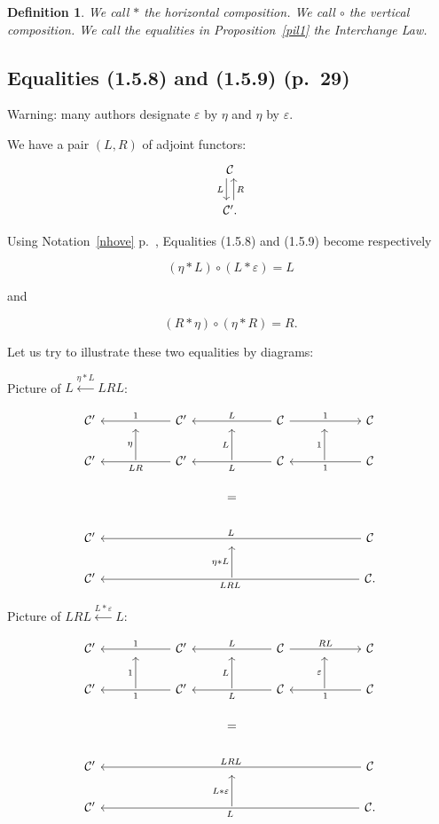 \documentclass[12pt]{article}%
\newtheorem{df}[thm]{Definition}%
\theoremstyle{remark}
\theoremstyle{definition}
\newcommand{\nn}{\noindent}
\newcommand{\C}{\mathcal C}
\newcommand{\ee}{\varepsilon}
\begin{document}
\begin{df}\label{dil1} 
We call $*$ the {\em horizontal composition}.  We call $\circ$ the {\em vertical composition}.  We call the equalities in Proposition~\ref{pil1} the {\em Interchange Law}. 
\end{df}


\subsection{Equalities (1.5.8) and (1.5.9) (p.~29)}

Warning: many authors designate $\varepsilon$ by $\eta$ and $\eta$ by $\varepsilon$. 

We have a pair $(L,R)$ of adjoint functors: 
$$
\begin{tikzcd}
\C\ar[xshift=-.7ex]{d}[swap]{L}\\ 
\C'.\ar[xshift=.7ex]{u}[swap]{R}
\end{tikzcd}
$$

Using Notation~\ref{nhove} p.~\pageref{nhove}, Equalities (1.5.8) and (1.5.9) become respectively 

\begin{equation}\label{158}
(\eta*L)\circ(L*\ee)=L
\end{equation}

\nn and 

\begin{equation}\label{159}
(R*\eta)\circ(\eta*R)=R.
\end{equation}

Let us try to illustrate these two equalities by diagrams:

Picture of $L\xleftarrow{\eta*L}LRL$:
 
$$
\begin{tikzcd}
%
\C'&{}&\C'\ar{ll}{}[swap]{1}&{}&\C\ar{ll}{}[swap]{L}\ar{rr}{}{1}&{}&\C\\ 
%
\C'&\ar{u}{\eta}&\C'\ar{ll}{}{LR}&\ar{u}{L}&\C\ar{ll}{}{L}&\ar{u}{1}&\C\ar{ll}{}{1}\\ 
%
&&&=\\ 
%
\C'&&&{}&&&\C\ar{llllll}[swap]{L}\\
%
\C'&&&\ar{u}{\eta*L}&&&\C\ar{llllll}{LRL}.
%
\end{tikzcd}
$$ 

Picture of $LRL\xleftarrow{L*\ee}L$:
 
$$
\begin{tikzcd}
%
\C'&{}&\C'\ar{ll}{}[swap]{1}&{}&\C\ar{ll}{}[swap]{L}\ar{rr}{}{RL}&{}&\C\\ 
%
\C'&\ar{u}{1}&\C'\ar{ll}{}{1}&\ar{u}{L}&\C\ar{ll}{}{L}&\ar{u}{\ee}&\C\ar{ll}{}{1}\\ 
%
&&&=\\ 
%
\C'&&&{}&&&\C\ar{llllll}[swap]{LRL}\\
%
\C'&&&\ar{u}{L*\ee}&&&\C\ar{llllll}{L}.
%
\end{tikzcd}
$$ 
\end{document}
